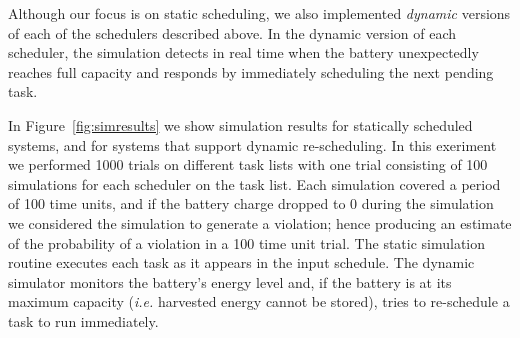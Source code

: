 Although our focus is on static scheduling, we also implemented \emph{dynamic} versions of each of the schedulers described 
above.  In the dynamic version of each scheduler, the simulation detects in real time when the 
battery unexpectedly reaches full capacity and responds by immediately scheduling the next pending task. 








In Figure~\ref{fig:simresults} 
we show simulation results for statically scheduled systems, and for systems that support dynamic re-scheduling.  
In this exeriment 
we performed 1000 trials on different task lists
with one trial consisting of 100 simulations for each scheduler on the task list. 
Each simulation covered a period of 100 time units, and if the battery charge dropped to 0 during the simulation we 
considered the simulation to generate a violation; 
hence producing an estimate of the probability of a violation in a 100 time unit trial. 
The static simulation routine executes each task as it appears in the input schedule.  
The dynamic simulator monitors the battery's energy level and, if the battery is at its maximum capacity (\emph{i.e.} harvested energy cannot be stored), tries to re-schedule a task to run immediately.  

